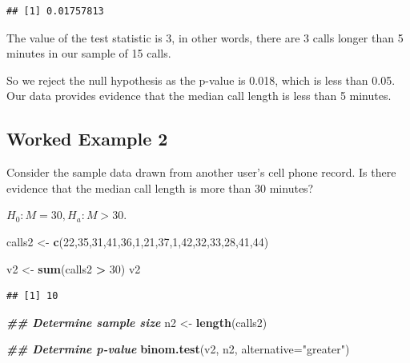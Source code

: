 \documentclass[
]{book}
\newenvironment{Shaded}{\begin{snugshade}}{\end{snugshade}}
\newcommand{\AttributeTok}[1]{\textcolor[rgb]{0.13,0.29,0.53}{#1}}
\newcommand{\DecValTok}[1]{\textcolor[rgb]{0.00,0.00,0.81}{#1}}
\newcommand{\DocumentationTok}[1]{\textcolor[rgb]{0.56,0.35,0.01}{\textbf{\textit{#1}}}}
\newcommand{\FunctionTok}[1]{\textcolor[rgb]{0.13,0.29,0.53}{\textbf{#1}}}
\newcommand{\NormalTok}[1]{#1}
\newcommand{\OtherTok}[1]{\textcolor[rgb]{0.56,0.35,0.01}{#1}}
\newcommand{\SpecialCharTok}[1]{\textcolor[rgb]{0.81,0.36,0.00}{\textbf{#1}}}
\newcommand{\StringTok}[1]{\textcolor[rgb]{0.31,0.60,0.02}{#1}}
\theoremstyle{definition}
\theoremstyle{definition}
\theoremstyle{definition}
\theoremstyle{definition}
\theoremstyle{remark}
\begin{document}
\begin{verbatim}
## [1] 0.01757813
\end{verbatim}

The value of the test statistic is 3, in other words, there are 3 calls longer than 5 minutes in our sample of 15 calls.

So we reject the null hypothesis as the p-value is 0.018, which is less than 0.05. Our data provides evidence that the median call length is less than 5 minutes.

\hypertarget{worked-example-2-1}{%
\subsection{Worked Example 2}\label{worked-example-2-1}}

Consider the sample data drawn from another user's cell phone record. Is there evidence that the median call length is more than 30 minutes?

\(H_0: M = 30, H_a: M > 30\).

\begin{Shaded}
\begin{Highlighting}[]
\NormalTok{calls2 }\OtherTok{\textless{}{-}} \FunctionTok{c}\NormalTok{(}\DecValTok{22}\NormalTok{,}\DecValTok{35}\NormalTok{,}\DecValTok{31}\NormalTok{,}\DecValTok{41}\NormalTok{,}\DecValTok{36}\NormalTok{,}\DecValTok{1}\NormalTok{,}\DecValTok{21}\NormalTok{,}\DecValTok{37}\NormalTok{,}\DecValTok{1}\NormalTok{,}\DecValTok{42}\NormalTok{,}\DecValTok{32}\NormalTok{,}\DecValTok{33}\NormalTok{,}\DecValTok{28}\NormalTok{,}\DecValTok{41}\NormalTok{,}\DecValTok{44}\NormalTok{)}

\NormalTok{v2 }\OtherTok{\textless{}{-}} \FunctionTok{sum}\NormalTok{(calls2 }\SpecialCharTok{\textgreater{}} \DecValTok{30}\NormalTok{)}
\NormalTok{v2}
\end{Highlighting}
\end{Shaded}

\begin{verbatim}
## [1] 10
\end{verbatim}

\begin{Shaded}
\begin{Highlighting}[]
\DocumentationTok{\#\# Determine sample size}
\NormalTok{n2 }\OtherTok{\textless{}{-}} \FunctionTok{length}\NormalTok{(calls2)}

\DocumentationTok{\#\# Determine p{-}value}
\FunctionTok{binom.test}\NormalTok{(v2, n2, }\AttributeTok{alternative=}\StringTok{"greater"}\NormalTok{)}
\end{Highlighting}
\end{Shaded}
\end{document}

